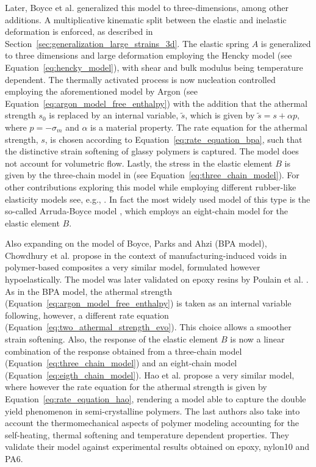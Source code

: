 Later, Boyce et al. \citep{boyceLargeInelasticDeformation1988} generalized this model to three-dimensions, among other additions.
A multiplicative kinematic split between the elastic and inelastic deformation is enforced, as described in Section~\ref{sec:generalization_large_strains_3d}.
The elastic spring $A$ is generalized to three dimensions and large deformation employing the Hencky model (see Equation~\eqref{eq:hencky_model}), with shear and bulk modulus being temperature dependent.
The thermally activated process is now nucleation controlled employing the aforementioned model by Argon \citep{argonTheoryLowtemperaturePlastic1973} (see Equation~\eqref{eq:argon_model_free_enthalpy}) with the addition that the athermal strength $s_0$ is replaced by an internal variable, $\tilde s$, which is given by $\tilde{s}=s+\alpha p,$ where $p=-\sigma_m$ and $\alpha$ is a material property.
The rate equation for the athermal strength, $s$, is chosen according to Equation~\eqref{eq:rate_equation_bpa}, such that the distinctive strain softening of glassy polymers is captured.
The model does not account for volumetric flow.
Lastly, the stress in the elastic element $B$ is given by the three-chain model in (see Equation~\eqref{eq:three_chain_model}).
For other contributions exploring this model while employing different rubber-like elasticity models see, e.g., \cite{arrudaEvolutionPlasticAnisotropy1993, arrudaEffectsStrainRate1995, wuImprovedNetworkModels1993, buckleyGlassrubberConstitutiveModel1995, sweeneyRateDependentNetwork1995}.
In fact the most widely used model of this type is the so-called Arruda-Boyce model \citep{arrudaEvolutionPlasticAnisotropy1993, arrudaEffectsStrainRate1995}, which employs an eight-chain model for the elastic element $B$.

Also expanding on the model of Boyce, Parks and Ahzi \citep{boyceLargeInelasticDeformation1988} (BPA model), Chowdhury et al. \citep{chowdhuryEffectsManufacturingInducedVoids2008} propose in the context of manufacturing-induced voids in polymer-based composites a very similar model, formulated however hypoelastically.
The model was later validated on epoxy resins by Poulain et al. \citep{poulainFinitestrainElastoviscoplasticBehavior2014}.
As in the BPA model, the athermal strength (Equation~\eqref{eq:argon_model_free_enthalpy}) is taken as an internal variable following, however, a different rate equation (Equation~\eqref{eq:two_athermal_strength_evo}).
This choice allows a smoother strain softening.
Also, the response of the elastic element $B$ is now a linear combination of the response obtained from a three-chain model (Equation~\eqref{eq:three_chain_model}) and an eight-chain model (Equation~\eqref{eq:eigth_chain_model}).
Hao et al. \citep{haoUnifiedAmorphousCrystalline2022} propose a very similar model, where however the rate equation for the athermal strength is given by Equation~\eqref{eq:rate_equation_hao}, rendering a model able to capture the double yield phenomenon in semi-crystalline polymers.
The last authors also take into account the thermomechanical aspects of polymer modeling accounting for the self-heating, thermal softening and temperature dependent properties.
They validate their model against experimental results obtained on epoxy, nylon10 and PA6.

